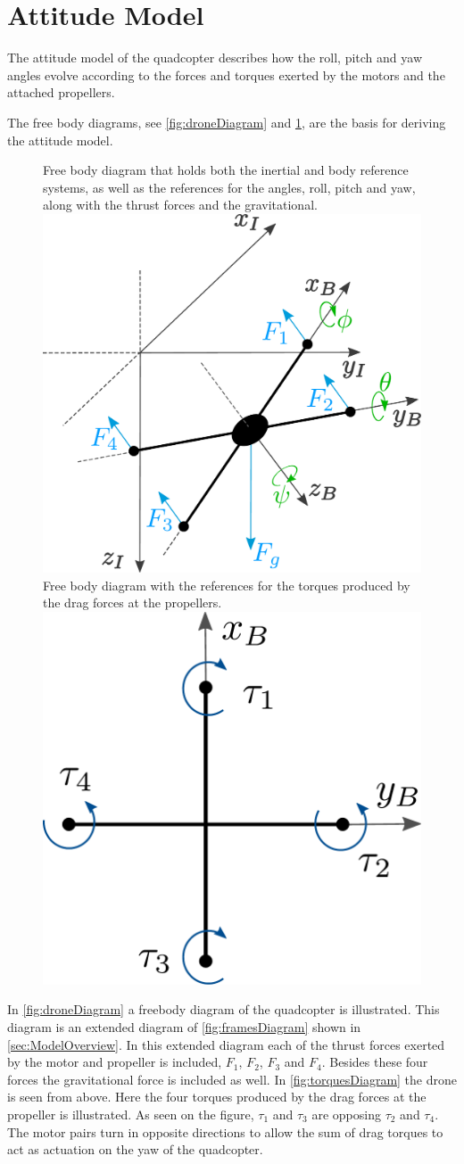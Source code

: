 \section{Attitude Model} \label{sec:AttitudeModel}
The attitude model of the quadcopter describes how the roll, pitch and yaw angles evolve according to the forces and torques exerted by the motors and the attached propellers. 

The free body diagrams, see \autoref{fig:droneDiagram} and \ref{fig:torquesDiagram}, are the basis for deriving the attitude model.
%
\begin{figure}[H]
  \captionbox
  {
    Free body diagram that holds both the inertial and body reference systems, as well as the references for the angles, roll, pitch and yaw, along with the thrust forces and the gravitational.
    \label{fig:droneDiagram}
  }
  {
    \includegraphics[width=.48\textwidth]{figures/droneDiagram}
  }
  \hspace{5pt}
  \captionbox
  {
    Free body diagram with the references for the torques produced by the drag forces at the propellers.
    \label{fig:torquesDiagram}
  }
  {
    \includegraphics[width=.42\textwidth]{figures/torquesDiagram}
    \vspace{.5cm}
  }
\end{figure}
%
In \autoref{fig:droneDiagram} a freebody diagram of the quadcopter is illustrated. This diagram is an extended diagram of \autoref{fig:framesDiagram} shown in \autoref{sec:ModelOverview}. In this extended diagram each of the thrust forces exerted by the motor and propeller is included, $F_1$, $F_2$, $F_3$ and $F_4$. Besides these four forces the gravitational force is included as well. In \autoref{fig:torquesDiagram} the drone is seen from above. Here the four torques produced by the drag forces at the propeller is illustrated. As seen on the figure, $\tau_1$ and $\tau_3$ are opposing $\tau_2$ and $\tau_4$. The motor pairs turn in opposite directions to allow the sum of drag torques to act as actuation on the yaw of the quadcopter.

